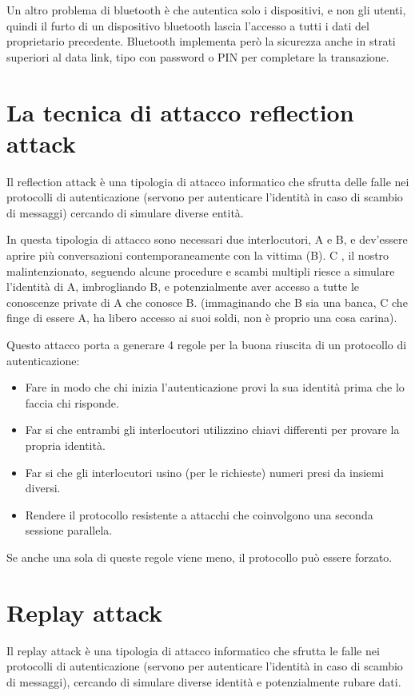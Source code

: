 Un altro problema di bluetooth è che autentica solo i dispositivi, e non gli utenti, quindi il furto di un dispositivo bluetooth lascia l’accesso a tutti i dati del proprietario precedente.
Bluetooth implementa però la sicurezza anche in strati superiori al data link, tipo con password o PIN per completare la transazione.

\section{La tecnica di attacco reflection attack}

Il reflection attack è una tipologia di attacco informatico che sfrutta delle falle nei protocolli di autenticazione (servono per autenticare l’identità in caso di scambio di messaggi) cercando di simulare diverse entità.

In questa tipologia di attacco sono necessari due interlocutori, A e B, e dev’essere aprire più conversazioni contemporaneamente con la vittima (B).
C , il nostro malintenzionato, seguendo alcune procedure e scambi multipli riesce a simulare l’identità di A, imbrogliando B, e potenzialmente aver accesso a tutte le conoscenze private di A che conosce B. (immaginando che B sia una banca, C che finge di essere A, ha libero accesso ai suoi soldi, non è proprio una cosa carina).

Questo attacco porta a generare 4 regole per la buona riuscita di un protocollo di autenticazione:
\begin{itemize}
\item	Fare in modo che chi inizia l’autenticazione provi la sua identità prima che lo faccia chi risponde.
\item	Far si che entrambi gli interlocutori utilizzino chiavi differenti per provare la propria identità.
\item	Far si che gli interlocutori usino (per le richieste) numeri presi da insiemi diversi.
\item	Rendere il protocollo resistente a attacchi che coinvolgono una seconda sessione parallela.
\end{itemize}
Se anche una sola di queste regole viene meno, il protocollo può essere forzato.

\section{Replay attack}

Il replay attack è una tipologia di attacco informatico che sfrutta le falle nei protocolli di autenticazione (servono per autenticare l’identità in caso di scambio di messaggi), cercando di simulare diverse identità e potenzialmente rubare dati.

